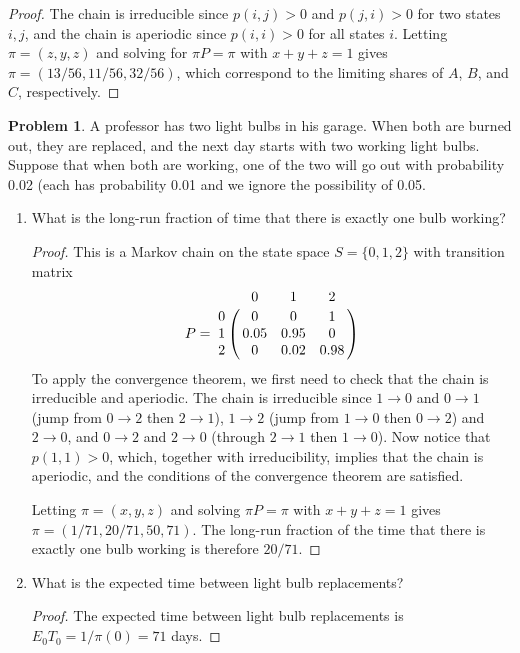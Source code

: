 \documentclass[oneside,reqno]{amsart}
\theoremstyle{definition}
\newtheorem{prob}{Problem}
\begin{document}
\begin{proof}
The chain is irreducible since $p(i,j) > 0$ and $p(j, i) > 0$ for two states $i,j$, and the chain is aperiodic since $p(i,i) > 0$ for all states $i$. Letting $\pi = (z,y,z)$ and solving for $\pi P= \pi$ with $x+y+z = 1$ gives $\pi = (13/56, 11/56, 32/56)$, which correspond to the limiting shares of $A$, $B$, and $C$, respectively. 
\end{proof}




\begin{prob}
A professor has two light bulbs in his garage. When both are burned out, they are replaced, and the next day starts with two working light bulbs. Suppose that when both are working, one of the two will go out with probability 0.02 (each has probability 0.01 and we ignore the possibility of 0.05.
\end{prob}


\begin{enumerate}
\item
What is the long-run fraction of time that there is exactly one bulb working?
\begin{proof}
This is a Markov chain on the state space $S = \{0,1,2\}$ with transition matrix 
\[
	P = \bordermatrix{~ & 0 & 1 & 2 \cr 
		0 & 0 & 0 & 1  \cr
		1 & 0.05 & 0.95 & 0  \cr
		2 & 0 & 0.02 & 0.98  \cr}
\]
To apply the convergence theorem, we first need to check that the chain is irreducible and aperiodic. The chain is irreducible since $1 \to 0$ and $0 \to 1$ (jump from $0 \to 2$ then $2 \to 1$), $1 \to 2$ (jump from $1 \to 0$ then $0 \to 2$) and $2 \to 0$, and $0 \to 2$ and $2 \to 0$ (through $2 \to 1$ then $1 \to 0$). Now notice that $p(1,1) > 0$, which, together with irreducibility, implies that the chain is aperiodic, and the conditions of the convergence theorem are satisfied. 
\par
Letting $\pi = (x,y,z)$ and solving $\pi P = \pi$ with $x+y+z=1$ gives $\pi = (1/71, 20/71, 50,71)$. The long-run fraction of the time that there is exactly one bulb working is therefore $20/71$.
\end{proof}
\item
What is the expected time between light bulb replacements?
\begin{proof}
The expected time between light bulb replacements is $E_0 T_0 = 1/\pi(0) = 71$ days.
\end{proof}
\end{enumerate}
\end{document}
